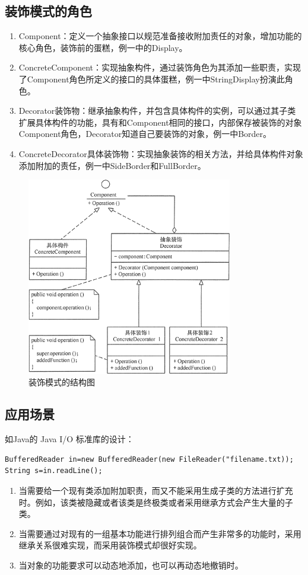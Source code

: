 \subsection{装饰模式的角色}
\begin{enumerate}
	\item Component：定义一个抽象接口以规范准备接收附加责任的对象，增加功能的核心角色，装饰前的蛋糕，例一中的Display。
	\item ConcreteComponent：实现抽象构件，通过装饰角色为其添加一些职责，实现了Component角色所定义的接口的具体蛋糕，例一中StringDisplay扮演此角色。
	\item Decorator装饰物：继承抽象构件，并包含具体构件的实例，可以通过其子类扩展具体构件的功能，具有和Component相同的接口，内部保存被装饰的对象
	Component角色，Decorator知道自己要装饰的对象，例一中Border。
	\item ConcreteDecorator具体装饰物：实现抽象装饰的相关方法，并给具体构件对象添加附加的责任，例一中SideBorder和FullBorder。
\end{enumerate}
\begin{figure}[!h]
	\centering
	\includegraphics[width=0.8\textwidth]{image/12-1}
	\caption{装饰模式的结构图}
\end{figure}
\subsection{应用场景}
如Java的 Java I/O 标准库的设计：
\begin{lstlisting}
BufferedReader in=new BufferedReader(new FileReader("filename.txt));
String s=in.readLine();
\end{lstlisting}
\begin{enumerate}
	\item 当需要给一个现有类添加附加职责，而又不能采用生成子类的方法进行扩充时。例如，该类被隐藏或者该类是终极类或者采用继承方式会产生大量的子类。
	\item 当需要通过对现有的一组基本功能进行排列组合而产生非常多的功能时，采用继承关系很难实现，而采用装饰模式却很好实现。
	\item 当对象的功能要求可以动态地添加，也可以再动态地撤销时。
\end{enumerate}
